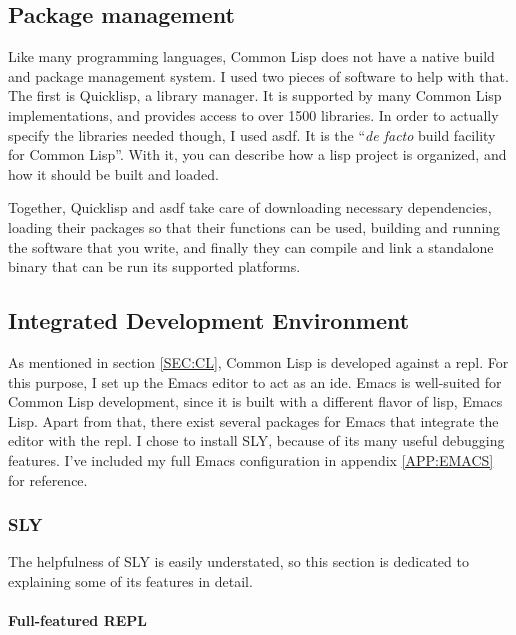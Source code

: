 
\label{SEC:DEV_ENV}

\subsection{Package management}

Like many programming languages,
Common Lisp does not have a native build and package management system.
I used two pieces of software to help with that.
The first is Quicklisp,
a library manager.
It is supported by many Common Lisp implementations,
and provides access to over 1500 libraries.\cite{quicklisp}
In order to actually specify the libraries needed though,
I used \ac{asdf}.
It is the ``\textit{de facto} build facility for Common Lisp''\cite{asdf}.
With it,
you can describe how a lisp project is organized,
and how it should be built and loaded.

Together,
Quicklisp and \ac{asdf} take care of downloading necessary dependencies,
loading their packages so that their functions can be used,
building and running the software that you write,
and finally they can compile and link a standalone binary that can be run its supported platforms.

\subsection{Integrated Development Environment}

As mentioned in section \ref{SEC:CL},
Common Lisp is developed against a \ac{repl}.
For this purpose,
I set up the Emacs editor to act as an \ac{ide}.
Emacs is well-suited for Common Lisp development,
since it is built with a different flavor of lisp,
Emacs Lisp.
Apart from that,
there exist several packages for Emacs that integrate the editor with the \ac{repl}.
I chose to install SLY,
because of its many useful debugging features.
I've included my full Emacs configuration in appendix \ref{APP:EMACS} for reference.

\subsubsection{SLY}

The helpfulness of SLY is easily understated,
so this section is dedicated to explaining some of its features in detail\cite{sly}.

\paragraph{Full-featured REPL}

